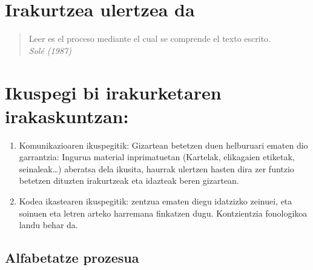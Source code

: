\documentclass[]{book}
\providecommand{\tightlist}{%
  \setlength{\itemsep}{0pt}\setlength{\parskip}{0pt}}
\begin{document}
\hypertarget{irakurtzea-ulertzea-da}{%
\section{Irakurtzea ulertzea da}\label{irakurtzea-ulertzea-da}}

\begin{quote}
Leer es el proceso mediante el cual se comprende el texto escrito.\\
\emph{Solé (1987)}
\end{quote}

\hypertarget{ikuspegi-bi-irakurketaren-irakaskuntzan}{%
\section{Ikuspegi bi irakurketaren irakaskuntzan:}\label{ikuspegi-bi-irakurketaren-irakaskuntzan}}

\begin{enumerate}
\def\labelenumi{\arabic{enumi}.}
\tightlist
\item
  Komunikazioaren ikuspegitik: Gizartean betetzen duen helburuari ematen dio
  garrantzia: Ingurua material inprimatuetan (Kartelak, elikagaien etiketak,
  seinaleak\ldots{}) aberatsa dela ikusita, haurrak ulertzen hasten dira zer funtzio betetzen
  dituzten irakurtzeak eta idazteak beren gizartean.
\item
  Kodea ikastearen ikuspegitik: zentzua ematen diegu idatzizko zeinuei, eta soinuen
  eta letren arteko harremana finkatzen dugu. Kontzientzia fonologikoa landu behar
  da.
\end{enumerate}

\hypertarget{alfabetatze-prozesua}{%
\subsection{Alfabetatze prozesua}\label{alfabetatze-prozesua}}
\end{document}
